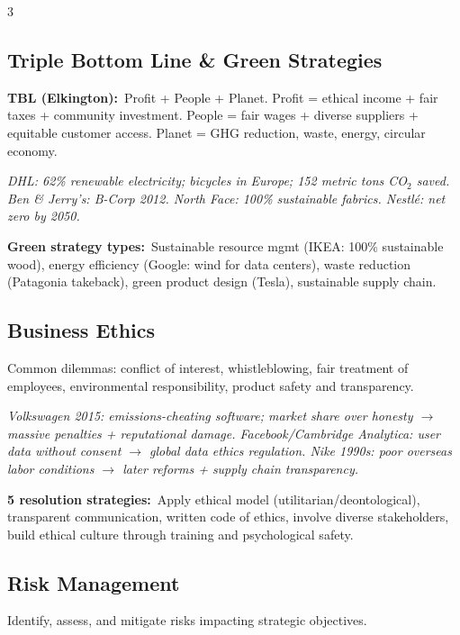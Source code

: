 \documentclass[7.6pt,letterpaper]{article}
\newcommand{\T}[1]{\textbf{\color{navy}#1}}
\newcommand{\kk}[2]{\noindent\T{#1}\ #2\par}
\newcommand{\eg}[1]{\textit{\color{mid}#1}}
\begin{document}
\begin{multicols}{3}
\subsection{Triple Bottom Line \& Green Strategies}

\kk{TBL (Elkington):}{Profit + People + Planet. Profit = ethical income + fair taxes + community investment. People = fair wages + diverse suppliers + equitable customer access. Planet = GHG reduction, waste, energy, circular economy.}

\eg{DHL: 62\% renewable electricity; bicycles in Europe; 152 metric tons CO$_2$ saved. Ben \& Jerry's: B-Corp 2012. North Face: 100\% sustainable fabrics. Nestlé: net zero by 2050.}

\kk{Green strategy types:}{Sustainable resource mgmt (IKEA: 100\% sustainable wood), energy efficiency (Google: wind for data centers), waste reduction (Patagonia takeback), green product design (Tesla), sustainable supply chain.}

\subsection{Business Ethics}

Common dilemmas: conflict of interest, whistleblowing, fair treatment of employees, environmental responsibility, product safety and transparency.

\eg{Volkswagen 2015: emissions-cheating software; market share over honesty $\to$ massive penalties + reputational damage. Facebook/Cambridge Analytica: user data without consent $\to$ global data ethics regulation. Nike 1990s: poor overseas labor conditions $\to$ later reforms + supply chain transparency.}

\kk{5 resolution strategies:}{Apply ethical model (utilitarian/deontological), transparent communication, written code of ethics, involve diverse stakeholders, build ethical culture through training and psychological safety.}

\subsection{Risk Management}

Identify, assess, and mitigate risks impacting strategic objectives.


\end{multicols}
\end{document}
